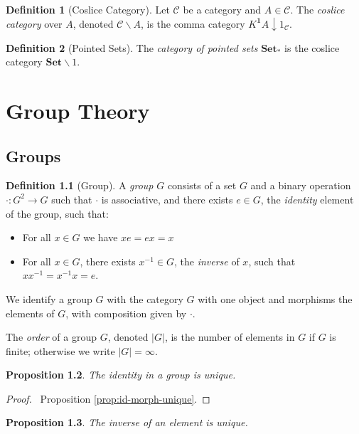 \documentclass{book}
\newtheorem{prop}{Proposition}[chapter]
\theoremstyle{definition}
\newtheorem{df}[prop]{Definition}
\newcommand{\inv}[1]{\ensuremath{{#1}^{-1}}}
\newcommand{\Set}{\ensuremath{\mathbf{Set}}}
\begin{document}
\begin{df}[Coslice Category]
    Let $\mathcal{C}$ be a category and $A \in \mathcal{C}$. The \emph{coslice category} over $A$, denoted $\mathcal{C} \backslash A$, is the comma category $K^{\mathbf{1}} A \downarrow 1_\mathcal{C}$.
\end{df}

\begin{df}[Pointed Sets]
    The \emph{category of pointed sets} $\Set_*$ is the coslice category $\Set \backslash 1$.
\end{df}

\part{Group Theory}

\chapter{Groups}

\begin{df}[Group]
    A \emph{group} $G$ consists of a set $G$ and a binary operation $\cdot : G^2 \rightarrow G$ such that $\cdot$ is associative, and there exists $e \in G$, the \emph{identity} element of the group, such that:
    \begin{itemize}
        \item For all $x \in G$ we have $xe = ex = x$
        \item For all $x \in G$, there exists $\inv{x} \in G$, the \emph{inverse} of $x$, such that $x \inv{x} = \inv{x} x = e$.
    \end{itemize}

    We identify a group $G$ with the category $G$ with one object and morphisms the elements of $G$, with composition given by $\cdot$.

    The \emph{order} of a group $G$, denoted $|G|$, is the number of elements in $G$ if $G$ is finite; otherwise we write $|G| = \infty$.
\end{df}

\begin{prop}
    The identity in a group is unique.
\end{prop}

\begin{proof}
    \pf\ Proposition \ref{prop:id-morph-unique}.
\end{proof}

\begin{prop}
    \label{prop:inv-unique}
    The inverse of an element is unique.
\end{prop}
\end{document}

